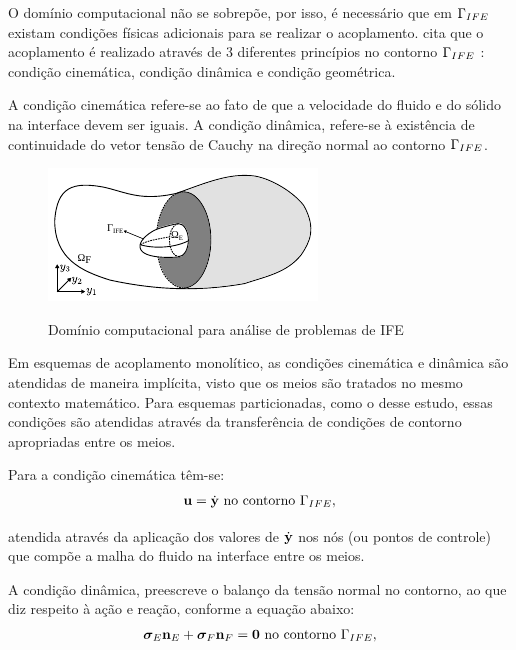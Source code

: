O domínio computacional não se sobrepõe, por isso, é necessário que em $\Gamma_{IFE}$ existam condições físicas adicionais para se realizar o acoplamento.  cita que o acoplamento é realizado através de 3 diferentes princípios no contorno $\Gamma_{IFE}$ : condição cinemática, condição dinâmica e condição geométrica.

A condição cinemática refere-se ao fato de que a velocidade do fluido e do sólido na interface devem ser iguais. A condição dinâmica, refere-se à existência de continuidade do vetor tensão de Cauchy na direção normal ao contorno $\Gamma_{IFE}$.

\begin{figure}[H]
	\caption{Domínio computacional para análise de problemas de IFE}
	\centering 
	\includegraphics[scale=2.0,trim=0cm 0cm 0cm 0.0cm, clip=true]{Imagens/Cap7/dominioIFE.pdf}	
	\label{fig:dominioIFE}
\end{figure}

Em esquemas de acoplamento monolítico, as condições cinemática e dinâmica são atendidas de maneira implícita, visto que os meios são tratados no mesmo contexto matemático. Para esquemas particionadas, como o desse estudo, essas condições são atendidas através da transferência de condições de contorno apropriadas entre os meios.

Para a condição cinemática têm-se:
\begin{align}
	\mathbf{u} = \dot{\mathbf{y}} \ \textrm{no contorno} \ \Gamma_{IFE},
\end{align}

\noindent atendida através da aplicação dos valores de $\dot{\mathbf{y}}$ nos nós (ou pontos de controle) que compõe a malha do fluido na interface entre os meios.

A condição dinâmica, preescreve o balanço da tensão normal no contorno, ao que diz respeito à ação e reação, conforme a equação abaixo:
\begin{align}
	\stressTensorS \snormalS + \stressTensorF \snormalF = \vzero \ \textrm{no contorno} \ \boundaryFSI,
\end{align}

